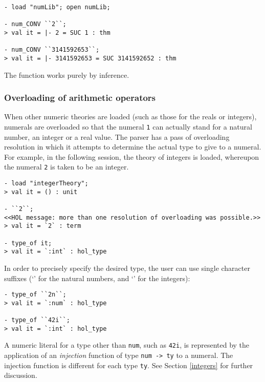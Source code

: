\begin{boxed}
\begin{verbatim}
- load "numLib"; open numLib;

- num_CONV ``2``;
> val it = |- 2 = SUC 1 : thm

- num_CONV ``3141592653``;
> val it = |- 3141592653 = SUC 3141592652 : thm
\end{verbatim}
\end{boxed}

\noindent The  function works purely by inference.

\subsubsection{Overloading of arithmetic operators}
\label{arith-overloading}

When other numeric theories are loaded (such as those for the reals or
integers), numerals are overloaded so that the numeral {\small\verb+1+} can
actually stand for a natural number, an integer or a real value. The
parser has a pass of overloading resolution in which it attempts to
determine the actual type to give to a numeral. For example, in the
following session, the theory of integers is loaded, whereupon the
numeral \verb+2+ is taken to be an integer.
%
\setcounter{sessioncount}{0}
\begin{session}
{\small
\begin{verbatim}
- load "integerTheory";
> val it = () : unit

- ``2``;
<<HOL message: more than one resolution of overloading was possible.>>
> val it = `2` : term

- type_of it;
> val it = `:int` : hol_type
\end{verbatim}
}
\end{session}

 In order to precisely specify the desired type, the user can use single
character suffixes (`' for the natural numbers, and `' for
the integers):
\begin{session}
{\small
\begin{verbatim}
- type_of ``2n``;
> val it = `:num` : hol_type

- type_of ``42i``;
> val it = `:int` : hol_type
\end{verbatim}
}
\end{session}

A numeric literal for a \HOL{} type other than \verb+num+, such as
\verb+42i+,  is represented by the application of an
\emph{injection} function of type {\small\verb+num -> ty+} to a
numeral. The injection function is different for each type
{\small\verb+ty+}. See Section \ref{integers} for further discussion.

